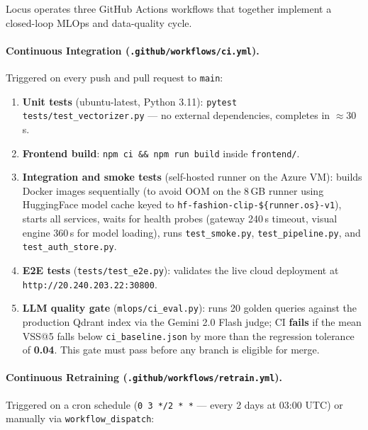 \documentclass[12pt]{article}
\begin{document}
Locus operates three GitHub Actions workflows that together implement a closed-loop MLOps and data-quality cycle.

\paragraph{Continuous Integration (\texttt{.github/workflows/ci.yml}).}
Triggered on every push and pull request to \texttt{main}:

\begin{enumerate}[leftmargin=*]
    \item \textbf{Unit tests} (ubuntu-latest, Python 3.11): \texttt{pytest tests/test\_vectorizer.py} --- no external dependencies, completes in $\approx$30\,s.
    \item \textbf{Frontend build}: \texttt{npm ci \&\& npm run build} inside \texttt{frontend/}.
    \item \textbf{Integration and smoke tests} (self-hosted runner on the Azure VM): builds Docker images sequentially (to avoid OOM on the 8\,GB runner using HuggingFace model cache keyed to \texttt{hf-fashion-clip-\$\{runner.os\}-v1}), starts all services, waits for health probes (gateway 240\,s timeout, visual engine 360\,s for model loading), runs \texttt{test\_smoke.py}, \texttt{test\_pipeline.py}, and \texttt{test\_auth\_store.py}.
    \item \textbf{E2E tests} (\texttt{tests/test\_e2e.py}): validates the live cloud deployment at \texttt{http://20.240.203.22:30800}.
    \item \textbf{LLM quality gate} (\texttt{mlops/ci\_eval.py}): runs 20 golden queries against the production Qdrant index via the Gemini 2.0 Flash judge; CI \textbf{fails} if the mean VSS@5 falls below \texttt{ci\_baseline.json} by more than the regression tolerance of \textbf{0.04}. This gate must pass before any branch is eligible for merge.
\end{enumerate}

\paragraph{Continuous Retraining (\texttt{.github/workflows/retrain.yml}).}
Triggered on a cron schedule (\texttt{0 3 */2 * *} --- every 2 days at 03:00 UTC) or manually via \texttt{workflow\_dispatch}:
\end{document}
